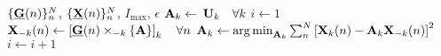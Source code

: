 \begin{algorithmic}[1]
  \Require $\{\ten{G}(n)\}_n^N$, $\{\ten{X}(n)\}_n^N$, $I_\text{max}$, $\epsilon$
  \State $\mat{A}_k \gets $ $\mat{U}_k \quad \forall k$
  \State $i\gets 1$
  \Repeat
  \State $\mat{X}_{-k}(n)\gets\left[\ten{G}(n)\mmprsi{\mat{A}}{k}\right]_k
  \quad \forall n$
  \State
  $\mat{A}_k\gets\textstyle{\argmin_{\mat{A}_k}\sum_n^N}\left[\mat{X}_k(n)-\mat{A}_k\mat{X}_{-k}(n)\right]^2$
  \EndFor
  \State $i\gets i+1$
\end{algorithmic}
